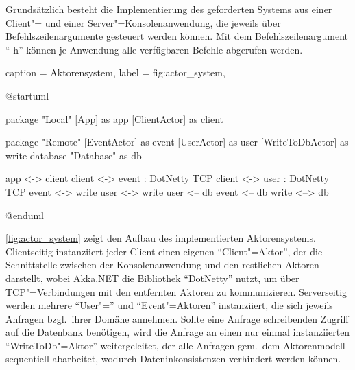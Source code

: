 Grundsätzlich besteht die Implementierung des geforderten Systems aus einer Client"= und einer Server"=Konsolenanwendung, die jeweils über Befehlszeilenargumente gesteuert werden können.
Mit dem Befehlszeilenargument \enquote{-h} können je Anwendung alle verfügbaren Befehle abgerufen werden.

\begin{dhbwfigure}{%
    caption	= Aktorensystem,
    label	= fig:actor_system,
}
\begin{plantuml}
@startuml

package "Local" {
    [App] as app
    [ClientActor] as client
}

package "Remote" {
    [EventActor] as event
    [UserActor] as user
    [WriteToDbActor] as write
    database "Database" as db
}

app <-> client
client <-> event : DotNetty TCP
client <-> user : DotNetty TCP
event <-> write
user <-> write
user <-- db
event <-- db
write <--> db

@enduml
\end{plantuml}
\end{dhbwfigure}

\autoref{fig:actor_system} zeigt den Aufbau des implementierten Aktorensystems.
Clientseitig instanziiert jeder Client einen eigenen \enquote{Client"=Aktor}, der die Schnittstelle zwischen der Konsolenanwendung und den restlichen Aktoren darstellt, wobei Akka.NET die Bibliothek \enquote{DotNetty} nutzt, um über TCP"=Verbindungen mit den entfernten Aktoren zu kommunizieren.
Serverseitig werden mehrere \enquote{User"=} und \enquote{Event"=Aktoren} instanziiert, die sich jeweils Anfragen bzgl.\ ihrer Domäne annehmen.
Sollte eine Anfrage schreibenden Zugriff auf die Datenbank benötigen, wird die Anfrage an einen nur einmal instanziierten \enquote{WriteToDb"=Aktor} weitergeleitet, der alle Anfragen gem.\ dem Aktorenmodell sequentiell abarbeitet, wodurch Dateninkonsistenzen verhindert werden können.
